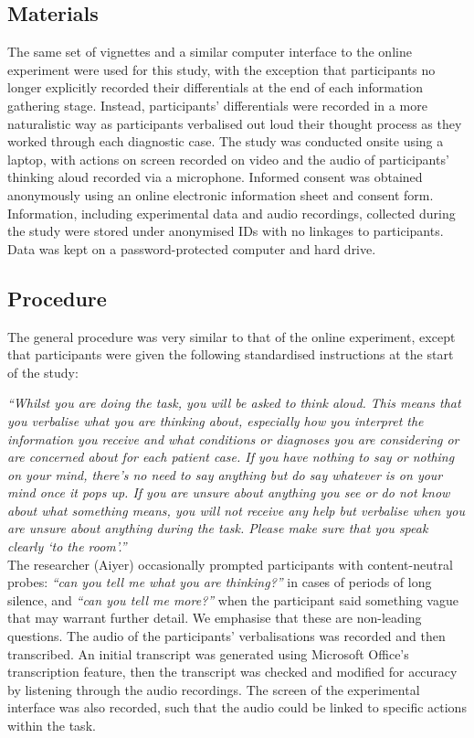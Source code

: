 \documentclass[a4paper, nobind]{templates/ociamthesis}
\begin{document}
\subsection{Materials}\label{materials-1}

The same set of vignettes and a similar computer interface to the online experiment were used for this study, with the exception that participants no longer explicitly recorded their differentials at the end of each information gathering stage. Instead, participants' differentials were recorded in a more naturalistic way as participants verbalised out loud their thought process as they worked through each diagnostic case. The study was conducted onsite using a laptop, with actions on screen recorded on video and the audio of participants' thinking aloud recorded via a microphone. Informed consent was obtained anonymously using an online electronic information sheet and consent form. Information, including experimental data and audio recordings, collected during the study were stored under anonymised IDs with no linkages to participants. Data was kept on a password-protected computer and hard drive.

\subsection{Procedure}\label{procedure-1}

The general procedure was very similar to that of the online experiment, except that participants were given the following standardised instructions at the start of the study:

\hfill\break
\emph{``Whilst you are doing the task, you will be asked to think aloud. This means that you verbalise what you are thinking about, especially how you interpret the information you receive and what conditions or diagnoses you are considering or are concerned about for each patient case. If you have nothing to say or nothing on your mind, there's no need to say anything but do say whatever is on your mind once it pops up. If you are unsure about anything you see or do not know about what something means, you will not receive any help but verbalise when you are unsure about anything during the task. Please make sure that you speak clearly `to the room'.''}\\

The researcher (Aiyer) occasionally prompted participants with content-neutral probes: \emph{``can you tell me what you are thinking?''} in cases of periods of long silence, and \emph{``can you tell me more?''} when the participant said something vague that may warrant further detail. We emphasise that these are non-leading questions. The audio of the participants' verbalisations was recorded and then transcribed. An initial transcript was generated using Microsoft Office's transcription feature, then the transcript was checked and modified for accuracy by listening through the audio recordings. The screen of the experimental interface was also recorded, such that the audio could be linked to specific actions within the task.
\end{document}
